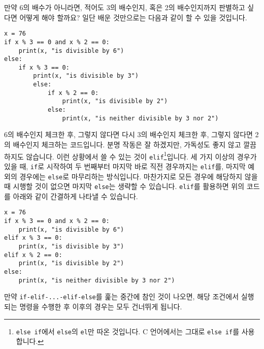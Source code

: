 \documentclass[../main.tex]{subfiles}
\begin{document}
만약 6의 배수가 아니라면, 적어도 3의 배수인지, 혹은 2의 배수인지까지 판별하고
싶다면 어떻게 해야 할까요?
일단 배운 것만으로는 다음과 같이 할 수 있을 것입니다.
\begin{verbatim}
x = 76
if x % 3 == 0 and x % 2 == 0:
    print(x, "is divisible by 6")
else:
    if x % 3 == 0:
        print(x, "is divisible by 3")
        else:
            if x % 2 == 0:
                print(x, "is divisible by 2")
            else:
                print(x, "is neither divisible by 3 nor 2")
\end{verbatim}
6의 배수인지 체크한 후, 그렇지 않다면 다시 3의 배수인지 체크한 후, 그렇지
않다면 2의 배수인지 체크하는 코드입니다.  분명 작동은 잘 하겠지만, 가독성도
좋지 않고 깔끔하지도 않습니다.  이런 상황에서 쓸 수 있는 것이
\texttt{elif}\footnote{\texttt{else if}에서 \texttt{else}의 \texttt{el}만 따온
것입니다. C 언어에서는 그대로 \texttt{else if}를 사용합니다.}입니다.  세 가지
이상의 경우가 있을 때, \texttt{if}로 시작하여 두 번째부터 마지막 바로 직전
경우까지는 \texttt{elif}를, 마지막 예외의 경우에는 \texttt{else}로 마무리하는
방식입니다.  마찬가지로 모든 경우에 해당하지 않을 때 시행할 것이 없으면 마지막
\texttt{else}는 생략할 수 있습니다.  \texttt{elif}를 활용하면 위의 코드를
아래와 같이 간결하게 나타낼 수 있습니다.
\begin{verbatim}
x = 76
if x % 3 == 0 and x % 2 == 0:
    print(x, "is divisible by 6")
elif x % 3 == 0:
    print(x, "is divisible by 3")
elif x % 2 == 0:
    print(x, "is divisible by 2")
else:
    print(x, "is neither divisible by 3 nor 2")
\end{verbatim}
만약 \texttt{if-elif-...-elif-else}를 훑는 중간에 참인 것이 나오면, 해당
조건에서 실행되는 명령을 수행한 후 이후의 경우는 모두 건너뛰게 됩니다.
\end{document}
